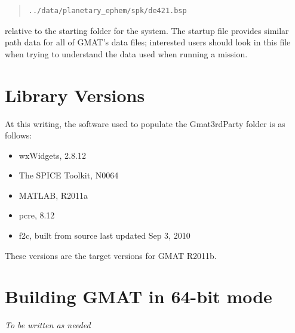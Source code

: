 \documentclass[letterpaper,10pt]{article}%
\begin{document}
\begin{quote}
\begin{verbatim}
../data/planetary_ephem/spk/de421.bsp
\end{verbatim}
\end{quote}

\noindent relative to the starting folder for the system.  The startup file provides similar path data for all of GMAT's data files; interested users should look in this file when trying to understand the data used when running a mission.

\section{\label{sec:ThirdPartyVersions}Library Versions}

At this writing, the software used to populate the Gmat3rdParty folder is as follows:

\begin{itemize}
\item wxWidgets,	2.8.12
\item The SPICE Toolkit, N0064
\item MATLAB, R2011a
\item pcre, 8.12
\item f2c, built from source last updated Sep 3, 2010
\end{itemize}
 
\noindent These versions are the target versions for GMAT R2011b.

\section{\label{app:64bit}Building GMAT in 64-bit mode}

\textit{To be written as needed}
\end{document}

